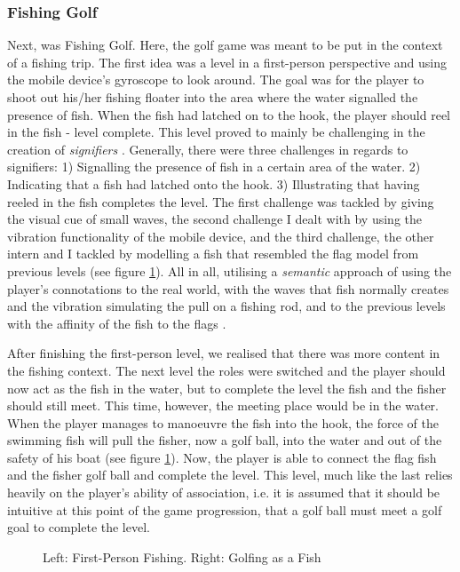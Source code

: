 \subsubsection{Fishing Golf}
Next, was Fishing Golf. Here, the golf game was meant to be put in the context of a fishing trip. The first idea was a level in a first-person perspective and using the mobile device's gyroscope to look around. The goal was for the player to shoot out his/her fishing floater into the area where the water signalled the presence of fish. When the fish had latched on to the hook, the player should reel in the fish - level complete. This level proved to mainly be challenging in the creation of \textit{signifiers} \cite{norman}. Generally, there were three challenges in regards to signifiers: 1) Signalling the presence of fish in a certain area of the water. 2) Indicating that a fish had latched onto the hook. 3) Illustrating that having reeled in the fish completes the level. The first challenge was tackled by giving the visual cue of small waves, the second challenge I dealt with by using the vibration functionality of the mobile device, and the third challenge, the other intern and I tackled by modelling a fish that resembled the flag model from previous levels (see figure \ref{Fishing}). All in all, utilising a \textit{semantic} approach of using the player's connotations to the real world, with the waves that fish normally creates and the vibration simulating the pull on a fishing rod, and to the previous levels with the affinity of the fish to the flags \cite{semantics}.

After finishing the first-person level, we realised that there was more content in the fishing context. The next level the roles were switched and the player should now act as the fish in the water, but to complete the level the fish and the fisher should still meet. This time, however, the meeting place would be in the water. When the player manages to manoeuvre the fish into the hook, the force of the swimming fish will pull the fisher, now a golf ball, into the water and out of the safety of his boat (see figure \ref{Fishing}). Now, the player is able to connect the flag fish and the fisher golf ball and complete the level. This level, much like the last relies heavily on the player's ability of association, i.e. it is assumed that it should be intuitive at this point of the game progression, that a golf ball must meet a golf goal to complete the level.
\begin{center}
  \begin{figure}[!htb]
    \noindent{}
    \caption{Left: First-Person Fishing. Right: Golfing as a Fish}
    \label{Fishing}
  \end{figure}
\end{center}
